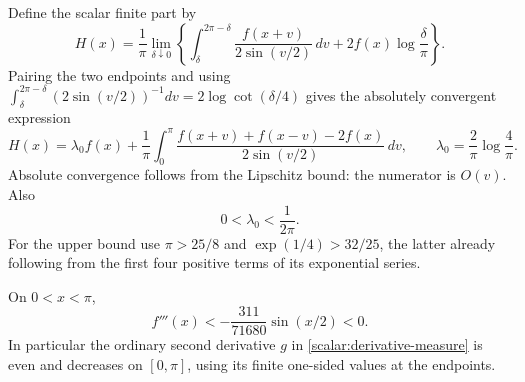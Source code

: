 Define the scalar finite part by
\begin{equation}\label{scalar:H-definition}
 H(x)=\frac1\pi\lim_{\delta\downarrow0}
 \left\{\int_{\delta}^{2\pi-\delta}
       \frac{f(x+v)}{2\sin(v/2)}\,dv
              +2f(x)\log\frac\delta\pi\right\}.
\end{equation}
Pairing the two endpoints and using
$\int_\delta^{2\pi-\delta}(2\sin(v/2))^{-1}dv
=2\log\cot(\delta/4)$ gives the absolutely convergent expression
\begin{equation}\label{scalar:H-paired}
 H(x)=\lambda_0f(x)+\frac1\pi\int_0^\pi
   \frac{f(x+v)+f(x-v)-2f(x)}{2\sin(v/2)}\,dv,
 \qquad \lambda_0=\frac2\pi\log\frac4\pi.
\end{equation}
Absolute convergence follows from the Lipschitz bound: the numerator
is $O(v)$.  Also
\begin{equation}\label{scalar:lambda-bound}
 0<\lambda_0<\frac1{2\pi}.
\end{equation}
For the upper bound use $\pi>25/8$ and
$\exp(1/4)>32/25$, the latter already following from the first four
positive terms of its exponential series.

\begin{lemma}
\label{scalar:third-derivative}
On $0<x<\pi$,
\begin{equation}\label{scalar:f-third}
 f'''(x)<-\frac{311}{71680}\sin(x/2)<0.
\end{equation}
In particular the ordinary second derivative $g$ in
\eqref{scalar:derivative-measure} is even and decreases on $[0,\pi]$,
using its finite one-sided values at the endpoints.
\end{lemma}

